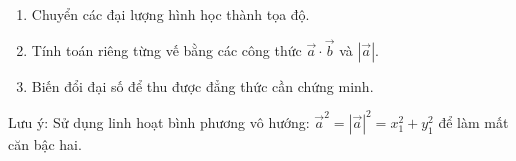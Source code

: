 \begin{enumerate}
\item Chuyển các đại lượng hình học thành tọa độ.
\item Tính toán riêng từng vế bằng các công thức $\overrightarrow{a} \cdot \overrightarrow{b}$ và $|\overrightarrow{a}|$.
\item Biến đổi đại số để thu được đẳng thức cần chứng minh.
\end{enumerate}
Lưu ý: Sử dụng linh hoạt bình phương vô hướng: $\overrightarrow{a}^2 = |\overrightarrow{a}|^2 = x_1^2 + y_1^2$ để làm mất căn bậc hai.
